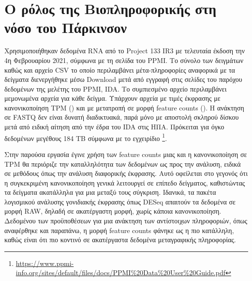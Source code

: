 \documentclass[12pt]{report}
\makeatletter
\let\oldchapter\chapter
\renewcommand{\chapter}{\@ifstar{\starchapter}{\nostarchapter}}
\newcommand{\starchapter}[1]{\oldchapter*{#1}\thispagestyle{mainstyle}}
\newcommand{\nostarchapter}[1]{\oldchapter{#1}\thispagestyle{mainstyle}}
\let\oldfootnote\footnote
\renewcommand{\footnote}[1]{\oldfootnote{\onehalfspacing #1}}
\makeatother
\begin{document}
        \section{Ο ρόλος της Βιοπληροφορικής στη νόσο του Πάρκινσον}
    
    \chapter{Μέθοδοι}
    \par
        Χρησιμοποιήθηκαν δεδομένα RNA από το Project 133 IR3 με τελευταία έκδοση την 4η Φεβρουαρίου 2021, σύμφωνα με τη σελίδα του PPMI. Το σύνολο των δειγμάτων καθώς και αρχείο CSV το οποίο περιλαμβάνει μέτα-πληροφορίες αναφορικά με τα δείγματα διενεργήθηκε μέσω Download μετά από εγγραφή στις σελίδες του παρόχου δεδομένων της μελέτης του PPMI, IDA. Το συμπιεσμένο αρχείο περιλαμβάνει μεμονωμένα αρχεία για κάθε δείγμα. Υπάρχουν αρχεία με τιμές έκφρασης με κανονικοποίηση TPM (\emph{\cite{Zhao2021TPMRepository}}) και με μετατροπή σε μορφή feature counts (\emph{\cite{Liao2014FeatureCounts:Features}}). Η ανάκτηση σε FASTQ  δεν είναι δυνατή διαδικτυακά, παρά μόνο με αποστολή σκληρού δίσκου μετά από ειδική αίτηση από την έδρα του IDA στις ΗΠΑ. Πρόκειται για όγκο δεδομένων μεγέθους 184 TB σύμφωνα με το εγχειρίδιο \footnote{\url{https://www.ppmi-info.org/sites/default/files/docs/PPMI\%20Data\%20User\%20Guide.pdf}}.
    \par
        Στην παρούσα εργασία έγινε χρήση των feature counts μιας και η κανονικοποίηση σε TPM θα περιόριζε την καταλληλότητα των δεδομένων ως προς την ανάλυση, ειδικά σε μεθόδους όπως την ανάλυση διαφορικής έκφρασης. Αυτό οφείλεται στο γεγονός ότι η συγκεκριμένη κανονικοποίηση γενικά λειτουργεί σε επίπεδο δείγματος, καθιστώντας τα δείγματα ακατάλληλα για μια μεταξύ τους σύγκριση. Ιδανικά, τα πακέτα λογισμικού ανάλυσης γονιδιακής έκφρασης όπως DESeq απαιτούν τα δεδομένα σε μορφή RAW, δηλαδή σε ακατέργαστη μορφή, χωρίς κάποια κανονικοποίηση. Δεδομένου των προϋποθέσεων για μια ανάκτηση των αντίστοιχων πληροφοριών, όπως αναφέρθηκε και παραπάνω, η μορφή feature counts φάνηκε ως η πιο κατάλληλη, καθώς είναι ότι πιο κοντινό σε ακατέργαστα δεδομένα μεταγραφικής πληροφορίας.
        
\end{document}
